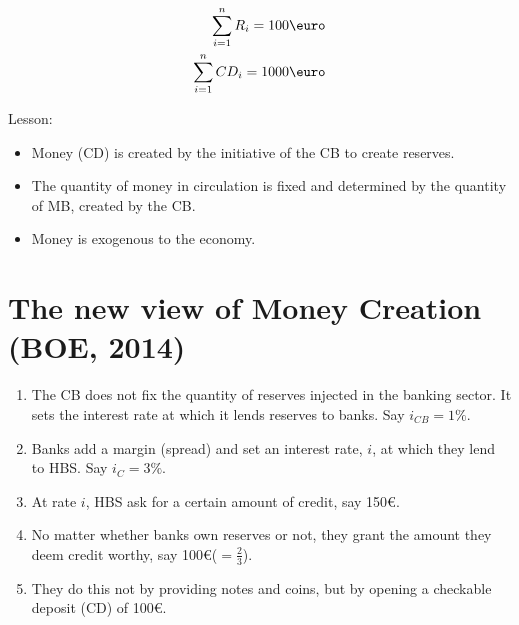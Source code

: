 \documentclass{report}
\begin{document}

\begin{equation*}
    \begin{aligned}
        \sum^{n}_{i=1} R_i=100\text{\euro} \\
        \sum^{n}_{i=1} CD_i=1000\text{\euro}
    \end{aligned}
\end{equation*}

Lesson: 
\begin{itemize}
    \item Money (CD) is created by the initiative of the CB to create reserves. 
    \item The quantity of money in circulation is fixed and determined by the quantity of MB, created by the CB. 
    \item Money is exogenous to the economy. 
\end{itemize}

\section{The new view of Money Creation (BOE, 2014)}

\begin{enumerate}
    \item The CB does not fix the quantity of reserves injected in the banking sector. It sets the interest rate at which it lends reserves to banks. Say $i_{CB}=1\%$. 
    \item Banks add a margin (spread) and set an interest rate, $i$, at which they lend to HBS. Say $i_{C}=3\%$.
    \item At rate $i$, HBS ask for a certain amount of credit, say 150\euro. 
    \item No matter whether banks own reserves or not, they grant the amount they deem credit worthy, say 100\euro ($=\frac{2}{3}$).
    \item They do this not by providing notes and coins, but by opening a checkable deposit (CD) of 100\euro.
\end{enumerate}
\end{document}
